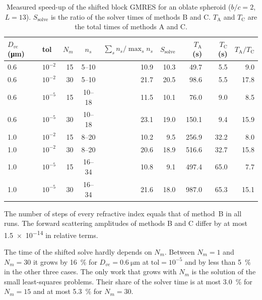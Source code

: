 \documentclass[11pt,a4paper]{article}
\begin{document}
\begin{table}[htbp]
  \centering
  \caption{Measured speed-up of the shifted block GMRES for an oblate
           spheroid ($b/c = 2$, $L = 13$).
           $S_{\text{solve}}$ is the ratio of the solver times of
           methods B and C.
           $T_{\text{A}}$ and $T_{\text{C}}$ are the total times of
           methods A and C.}
  \label{tab:shift-benchmark}
  \begin{tabular}{llrcrrrrr}
    \toprule
    $D_{ve}$ (\si{\micro\meter}) & tol & $N_m$ & $n_s$
      & $\sum_s n_s / \max_s n_s$ & $S_{\text{solve}}$
      & $T_{\text{A}}$ (\si{\second}) & $T_{\text{C}}$ (\si{\second})
      & $T_{\text{A}} / T_{\text{C}}$ \\
    \midrule
    0.6 & $10^{-2}$ & 15 & 5--10  & 10.9 & 10.3 &  49.7 &  5.5 &  9.0 \\
    0.6 & $10^{-2}$ & 30 & 5--10  & 21.7 & 20.5 &  98.6 &  5.5 & 17.8 \\
    0.6 & $10^{-5}$ & 15 & 10--18 & 11.5 & 10.1 &  76.0 &  9.0 &  8.5 \\
    0.6 & $10^{-5}$ & 30 & 10--18 & 23.1 & 19.0 & 150.1 &  9.4 & 15.9 \\
    1.0 & $10^{-2}$ & 15 & 8--20  & 10.2 &  9.5 & 256.9 & 32.2 &  8.0 \\
    1.0 & $10^{-2}$ & 30 & 8--20  & 20.6 & 18.9 & 516.6 & 32.7 & 15.8 \\
    1.0 & $10^{-5}$ & 15 & 16--34 & 10.8 &  9.1 & 497.4 & 65.0 &  7.7 \\
    1.0 & $10^{-5}$ & 30 & 16--34 & 21.6 & 18.0 & 987.0 & 65.3 & 15.1 \\
    \bottomrule
  \end{tabular}
\end{table}

The number of steps of every refractive index equals that of method~B
in all runs.
The forward scattering amplitudes of methods B and C differ by at most
\num{1.5e-14} in relative terms.

The time of the shifted solve hardly depends on $N_m$.
Between $N_m = 1$ and $N_m = 30$ it grows by \SI{16}{\percent} for
$D_{ve} = \SI{0.6}{\micro\meter}$ at $\text{tol} = 10^{-5}$ and by less
than \SI{5}{\percent} in the other three cases.
The only work that grows with $N_m$ is the solution of the small
least-squares problems.
Their share of the solver time is at most \SI{3.0}{\percent} for
$N_m = 15$ and at most \SI{5.3}{\percent} for $N_m = 30$.
\end{document}
